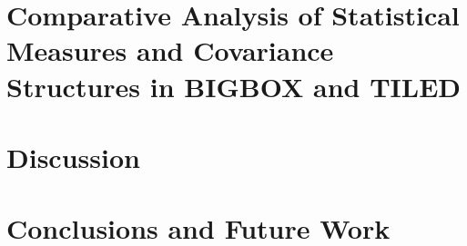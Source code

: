\documentclass[11pt,a4paper]{ipmu}
\begin{document}
\chapter{Comparative Analysis of Statistical Measures and Covariance Structures in BIGBOX and TILED}
\label{chap:results}
\minitoc 


\chapter{Discussion}
\label{chap:discussion}
\minitoc 


\chapter{Conclusions and Future Work}
\label{chap:conclusions}




\backmatter


\end{document}
